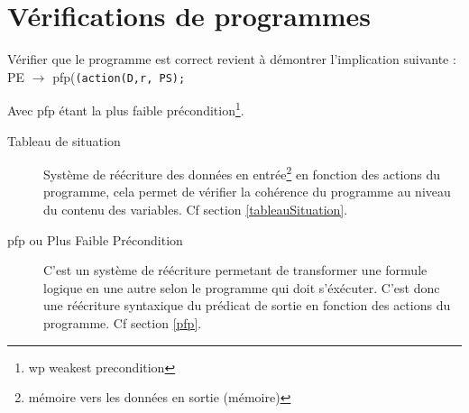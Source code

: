 \chapter{Vérifications de programmes}
	Vérifier que le programme est correct revient à démontrer l'implication suivante :\\ PE $\rightarrow$ pfp(\texttt{(action(D,r, PS);}

	Avec pfp étant la plus faible précondition\footnote{wp weakest precondition}.
	\begin{description}
		\item[Tableau de situation] Système de réécriture des données en entrée\footnote{mémoire vers les données en sortie (mémoire)} en fonction des
			actions du programme, cela permet de vérifier la cohérence du programme au niveau du contenu des variables. Cf section \ref{tableauSituation}.
		\item[pfp ou Plus Faible Précondition]	C'est un système de réécriture permetant de transformer une formule logique en une autre selon le programme qui doit s'éxécuter.
			C'est donc une réécriture syntaxique du prédicat de sortie en fonction des actions du programme. Cf section \ref{pfp}.
	\end{description}
